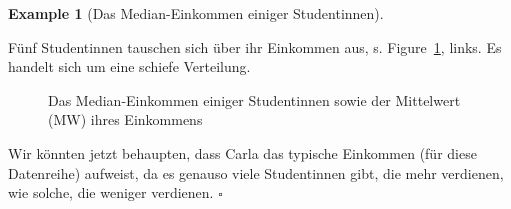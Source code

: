\documentclass[
  letterpaper,
  DIV=11,
  numbers=noendperiod]{scrartcl}
\theoremstyle{definition}
\newtheorem{example}{Example}[section]
\theoremstyle{definition}
\theoremstyle{definition}
\theoremstyle{remark}
\begin{document}
\begin{example}[Das Median-Einkommen einiger
Studentinnen]\protect\hypertarget{exm-med}{}\label{exm-med}

Fünf Studentinnen tauschen sich über ihr Einkommen aus, s.
Figure~\ref{fig-md1}, links. Es handelt sich um eine schiefe Verteilung.

\begin{figure}

\begin{minipage}{\linewidth}



\end{minipage}%
\newline
\begin{minipage}{\linewidth}



\end{minipage}%

\caption{\label{fig-md1}Das Median-Einkommen einiger Studentinnen sowie
der Mittelwert (MW) ihres Einkommens}

\end{figure}%

Wir könnten jetzt behaupten, dass Carla das typische Einkommen (für
diese Datenreihe) aufweist, da es genauso viele Studentinnen gibt, die
mehr verdienen, wie solche, die weniger verdienen. \(\square\)

\end{example}
\end{document}

